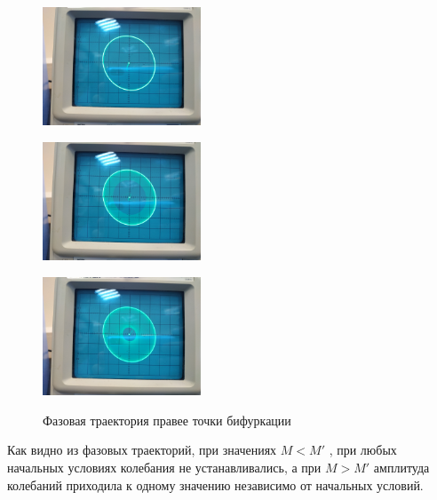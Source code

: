 \begin{center}
    \begin{figure}[H]
        \begin{minipage}{0.32\linewidth}
            \centering
            \includegraphics[height=100pt]{img/5.jpg} 
            \vspace{0pt}
            \label{fig:10}
        \end{minipage}
    \begin{minipage}{0.32\linewidth}
        \centering
        \includegraphics[height=100pt]{img/4.jpg} 
        \vspace{0pt}
        \label{fig:11}
    \end{minipage}
    \begin{minipage}{0.32\linewidth}
        \centering
        \includegraphics[height=100pt]{img/3.jpg} 
        \vspace{0pt}
        \label{fig:12}
    \end{minipage}
    \caption{Фазовая траектория правее точки бифуркации}
    \vspace{-40pt}
    \end{figure}
\end{center}

Как видно из фазовых траекторий, при значениях $M < M'$ , при любых начальных условиях колебания не устанавливались, а при 
$M > M'$ амплитуда колебаний приходила к одному значению независимо от начальных условий.

